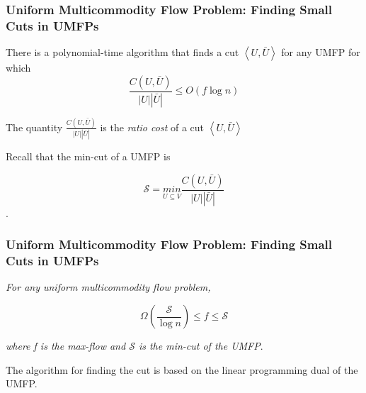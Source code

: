 \begin{frame}

        


\frametitle{Uniform Multicommodity Flow Problem: Finding Small Cuts in UMFPs}

There is a polynomial-time algorithm that finds a cut $\left \langle U, \bar{U} \right \rangle$ for any UMFP for which 
$$\frac{C(U,\bar{U})}{|U||\bar{U}|} \leq O(f \log n)$$  

The quantity $\frac{C(U,\bar{U})}{|U||\bar{U}|}$ is the \emph{ratio cost} of a cut $\left \langle U, \bar{U} \right \rangle$

Recall that the min-cut of a UMFP is 

$$\mathscr{S} = \underset{U\subseteq V}{min} \frac{C(U,\bar{U})}{\left | U \right |\left | \bar{U} \right |}$$.
\end{frame}

\begin{frame}
\frametitle{Uniform Multicommodity Flow Problem: Finding Small Cuts in UMFPs}

\emph{For any uniform multicommodity flow problem,}

$$\Omega\left ( \frac{\mathscr{S}}{\log n} \right ) \leq f \leq \mathscr{S}$$

\emph{where f is the max-flow and $\mathscr{S}$ is the min-cut of the UMFP}.

The algorithm for finding the cut is based on the linear programming dual of the UMFP. 
\end{frame}

